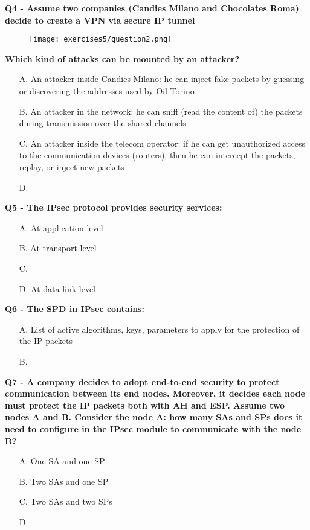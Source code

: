\textbf{Q4 - Assume two companies (Candies Milano and Chocolates Roma) decide to create a VPN via secure IP tunnel}
\begin{figure}[h]
    \centering
    \texttt{[image: exercises5/question2.png]}
\end{figure}
\textbf{Which kind of attacks can be mounted by an attacker?}
\begin{itemize}
    \item[A.] An attacker inside Candies Milano: he can inject fake packets by guessing or discovering the addresses used by Oil Torino
    \item[B.] An attacker in the network: he can sniff (read the content of) the packets during transmission over the shared channels
    \item[C.] An attacker inside the telecom operator: if he can get unauthorized access to the communication devices (routers), then he can intercept the packets, replay, or inject new packets
    \item[D.] 
\end{itemize}

\textbf{Q5 - The IPsec protocol provides security services:}
\begin{itemize}
    \item[A.] At application level
    \item[B.] At transport level
    \item[C.] 
    \item[D.] At data link level
\end{itemize}

\textbf{Q6 - The SPD in IPsec contains:}
\begin{itemize}
    \item[A.] List of active algorithms, keys, parameters to apply for the protection of the IP packets
    \item[B.] 
\end{itemize}

\textbf{Q7 - A company decides to adopt end-to-end security to protect communication between its end nodes. Moreover, it decides each node must protect the IP packets both with AH and ESP. Assume two nodes A and B. Consider the node A: how many SAs and SPs does it need to configure in the IPsec module to communicate with the node B?}
\begin{itemize}
    \item[A.] One SA and one SP
    \item[B.] Two SAs and one SP
    \item[C.] Two SAs and two SPs
    \item[D.] 
\end{itemize}

